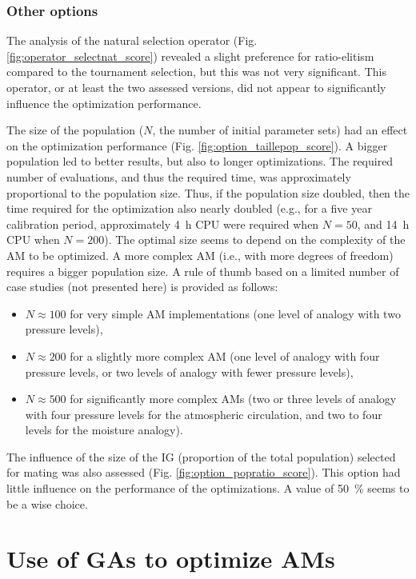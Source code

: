 \documentclass{ametsoc}
\begin{document}
\subsubsection{Other options}

The analysis of the natural selection operator (Fig. \ref{fig:operator_selectnat_score}) revealed a slight preference for ratio-elitism compared to the tournament selection, but this was not very significant. This operator, or at least the two assessed versions, did not appear to significantly influence the optimization performance.

The size of the population ($N$, the number of initial parameter sets) had an effect on the optimization performance (Fig. \ref{fig:option_taillepop_score}). A bigger population led to better results, but also to longer optimizations. The required number of evaluations, and thus the required time, was approximately proportional to the population size. Thus, if the population size doubled, then the time required for the optimization also nearly doubled (e.g., for a five year calibration period, approximately 4~h CPU were required when $N = 50$, and 14~h CPU when $N = 200$). The optimal size seems to depend on the complexity of the AM to be optimized. A more complex AM (i.e., with more degrees of freedom) requires a bigger population size. A rule of thumb based on a limited number of case studies (not presented here) is provided as follows:

\begin{itemize}
	\item $N\approx100$ for very simple AM implementations (one level of analogy with two pressure levels),
	\item $N\approx200$ for a slightly more complex AM (one level of analogy with four pressure levels, or two levels of analogy with fewer pressure levels),
	\item $N\approx500$ for significantly more complex AMs (two or three levels of analogy with four pressure levels for the atmospheric circulation, and two to four levels for the moisture analogy).
\end{itemize}

The influence of the size of the IG (proportion of the total population) selected for mating was also assessed (Fig. \ref{fig:option_popratio_score}). This option had little influence on the performance of the optimizations. A value of 50~\% seems to be a wise choice.


\section{Use of GAs to optimize AMs}
\label{sec:use}
\end{document}
